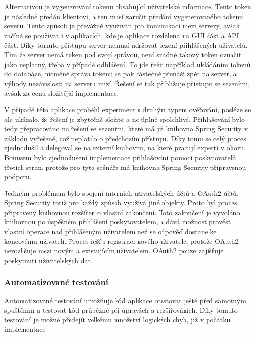 			Alternativou je vygenerování tokenu obsahující uživatelské informace.
			Tento token je následně předán klientovi, a ten musí zaručit předání vygenerovaného tokenu severu.
			Tento způsob je převážně využíván pro komunikaci mezi servery, avšak začíná se používat i v aplikacích, kde
			je aplikace rozdělena na \ac{GUI} část a \ac{API} část.
			Díky tomuto přístupu server nemusí udržovat sezení přihlášených uživatelů.
			Tím že server nemá token pod svojí správou, není snadné takový token označit jako neplatný, třeba v případě odhlášení.
			To jde řešit například ukládáním tokenů do databáze, nicméně správa tokenů se pak částečně přenáší zpět
			na server, a výhody nezávislosti na serveru mizí.
			Řešení se tak přibližuje přístupu se sezeními, avšak za cenu složitější implementace.

			V případě této aplikace proběhl experiment s druhým typem ověřování, posléze se ale ukázalo, že
			řešení je zbytečně složité a ne úplně spolehlivé.
			Přihlašování bylo tedy přepracováno na řešení se sezeními, které má již knihovna Spring Security v základu
			vyřešené, což neplatilo o předchozím přístupu.
			Díky tomu se celý proces zjednodušil a delegoval se na externí knihovnu, na které pracují experti v oboru.
			Bonusem bylo zjednodušení implementace přihlašování pomocí poskytovatelů třetích stran, protože pro tyto scénáře
			má knihovna Spring Security připravenou podporu.

			Jediným problémem bylo spojení interních uživatelských účtů a OAuth2 účtů.
			Spring Security totiž pro každý způsob využívá jiné objekty.
			Proto byl proces připravený knihovnou rozšířen o vlastní zakončení.
			Toto zakončení je vyvoláno knihovnou po úspěšném přihlášení poskytovatelem, a dává možnost provést vlastní operace nad
			přihlášeným uživatelem než se odpověď dostane ke koncovému uživateli.
			Proces řeší i registraci nového uživatele, protože OAuth2 nerozlišuje mezi novým a existujícím uživatelem.
			OAuth2 pouze zajišťuje poskytnutí uživatelských dat.


		\subsubsection{Automatizované testování}

		Automatizované testování umožňuje kód aplikace otestovat ještě před samotným spuštěním a testovat
		kód průběžně při úpravách a rozšiřováních.
		Díky tomuto testování je možné předejít velkému množství logických chyb, již v počátku implementace.

